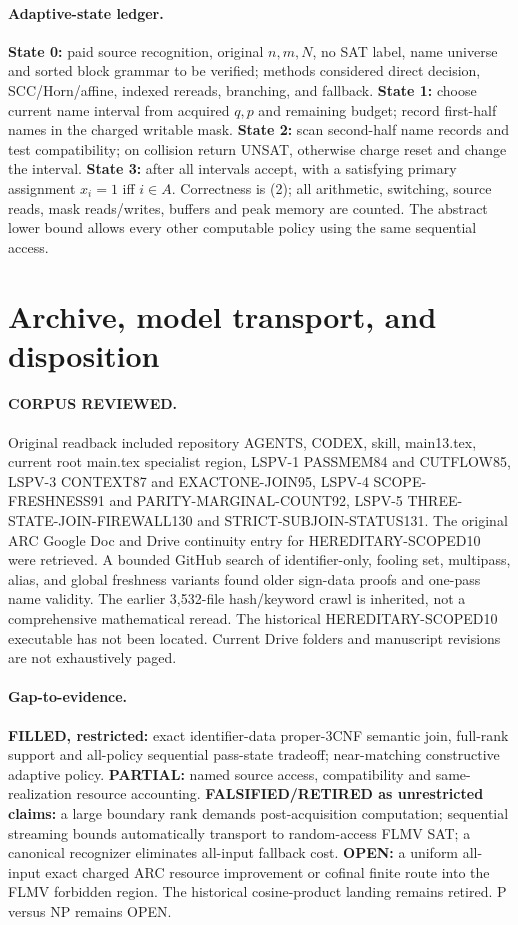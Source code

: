 \documentclass[11pt]{article}
\begin{document}
\paragraph{Adaptive-state ledger.}
\textbf{State 0:} paid source recognition, original $n,m,N$, no SAT label, name universe and sorted block grammar to be verified; methods considered direct decision, SCC/Horn/affine, indexed rereads, branching, and fallback. \textbf{State 1:} choose current name interval from acquired $q,p$ and remaining budget; record first-half names in the charged writable mask. \textbf{State 2:} scan second-half name records and test compatibility; on collision return UNSAT, otherwise charge reset and change the interval. \textbf{State 3:} after all intervals accept, with a satisfying primary assignment $x_i=1$ iff $i\in A$. Correctness is (2); all arithmetic, switching, source reads, mask reads/writes, buffers and peak memory are counted. The abstract lower bound allows every other computable policy using the same sequential access.

\section{Archive, model transport, and disposition}
\paragraph{CORPUS REVIEWED.}
Original readback included repository AGENTS, CODEX, skill, main13.tex, current root main.tex specialist region, LSPV-1 PASSMEM84 and CUTFLOW85, LSPV-3 CONTEXT87 and EXACTONE-JOIN95, LSPV-4 SCOPE-FRESHNESS91 and PARITY-MARGINAL-COUNT92, LSPV-5 THREE-STATE-JOIN-FIREWALL130 and STRICT-SUBJOIN-STATUS131. The original ARC Google Doc and Drive continuity entry for HEREDITARY-SCOPED10 were retrieved. A bounded GitHub search of identifier-only, fooling set, multipass, alias, and global freshness variants found older sign-data proofs and one-pass name validity. The earlier 3,532-file hash/keyword crawl is inherited, not a comprehensive mathematical reread. The historical HEREDITARY-SCOPED10 executable has not been located. Current Drive folders and manuscript revisions are not exhaustively paged.

\paragraph{Gap-to-evidence.}
\textbf{FILLED, restricted:} exact identifier-data proper-3CNF semantic join, full-rank support and all-policy sequential pass-state tradeoff; near-matching constructive adaptive policy. \textbf{PARTIAL:} named source access, compatibility and same-realization resource accounting. \textbf{FALSIFIED/RETIRED as unrestricted claims:} a large boundary rank demands post-acquisition computation; sequential streaming bounds automatically transport to random-access FLMV SAT; a canonical recognizer eliminates all-input fallback cost. \textbf{OPEN:} a uniform all-input exact charged ARC resource improvement or cofinal finite route into the FLMV forbidden region. The historical cosine-product landing remains retired. P versus NP remains OPEN.
\end{document}

